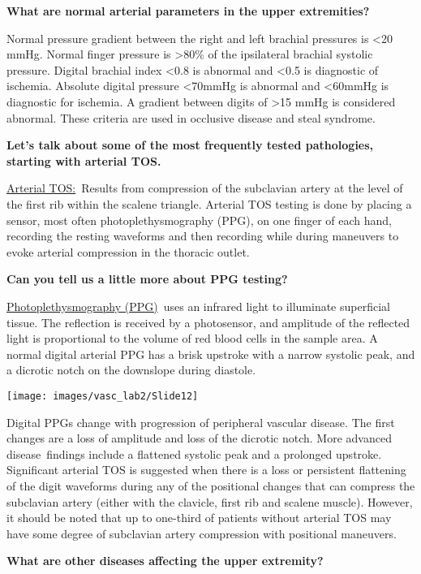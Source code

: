 \documentclass[
]{book}
\begin{document}
\textbf{What are normal arterial parameters in the upper extremities?}

Normal pressure gradient between the right and left brachial pressures
is \textless20 mmHg. Normal finger pressure is \textgreater80\% of the ipsilateral
brachial systolic pressure. Digital brachial index \textless0.8 is abnormal and
\textless0.5 is diagnostic of ischemia. Absolute digital pressure \textless70mmHg is
abnormal and \textless60mmHg is diagnostic for ischemia. A gradient between
digits of \textgreater15 mmHg is considered abnormal. These criteria are used in
occlusive disease and steal syndrome.\citep{chloros2008, sen2016}

\textbf{Let's talk about some of the most frequently tested pathologies,
starting with arterial TOS.}

\uline{Arterial TOS:}~Results from compression of the subclavian
artery at the level of the first rib within the scalene triangle.
Arterial TOS testing is done by placing a sensor, most often
photoplethysmography (PPG), on one finger of each hand, recording the
resting waveforms and then recording while during maneuvers to evoke
arterial compression in the thoracic outlet.\citep{size2013}

\textbf{Can you tell us a little more about PPG testing?}

\uline{Photoplethysmography (PPG)}~uses an infrared light to
illuminate superficial tissue. The reflection is received by a
photosensor, and amplitude of the reflected light is proportional to the
volume of red blood cells in the sample area. A normal digital arterial
PPG has a brisk upstroke with a narrow systolic peak, and a dicrotic
notch on the downslope during diastole.\citep{carter2001}

\texttt{[image: images/vasc\_lab2/Slide12]}

Digital PPGs change with progression of peripheral vascular disease. The
first changes are a loss of amplitude and loss of the dicrotic notch.
More advanced disease~findings include a flattened systolic peak and a
prolonged upstroke. Significant arterial TOS is suggested when there is
a loss or persistent flattening of the digit waveforms during any of the
positional changes that can compress the subclavian artery (either with
the clavicle, first rib and scalene muscle). However, it should be noted
that up to one-third of patients without arterial TOS may have some
degree of subclavian artery compression with positional maneuvers.

\textbf{What are other diseases affecting the upper extremity?}
\end{document}
